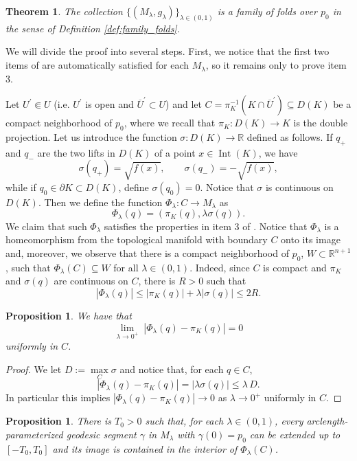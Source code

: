 \documentclass[11pt]{article}
\theoremstyle{definition}
\theoremstyle{remark}
\theoremstyle{plain}
\newtheorem{theorem}[definition]{Theorem}
\newtheorem{proposition}[definition]{Proposition}
\DeclareMathOperator{\Int}{Int}
\newcommand{\R}{\mathbb{R}}
\newcommand{\M}{M_\lambda}
\begin{document}
\begin{theorem}

The collection $\{(\M,g_\lambda)\}_{\lambda\in(0,1)}$ is a family of folds over $p_0$ in the sense of Definition \ref{def:family_folds}.

\end{theorem}

We will divide the proof into several steps. First, we notice that the first two items of  are automatically satisfied for each $\M$, so it remains only to prove item 3.

Let $U^\prime\Subset U$ (i.e. $U^\prime$ is open and $\overline U^\prime \subset U$) and let $C = \pi_K^{-1}(K\cap \overline U^\prime)\subseteq D(K)$ be a compact neighborhood of $p_0$, where we recall that $\pi_K:D(K)\to K$ is the double projection. Let us introduce the function $\sigma:D(K)\to \R$ defined as follows.
If $q_+$ and $q_-$ are the two lifts in $D(K)$ of a point
$x\in \Int(K)$, we have
$$\sigma(q_+)=\sqrt{f(x)},\qquad
\sigma(q_-)=-\sqrt{f(x)},$$
while if $q_0\in \partial K\subset D(K)$, define $\sigma(q_0)=0$.
Notice that $\sigma$ is continuous on $D(K)$. Then we define the function $\Phi_\lambda:C\to M_\lambda$ as
$$\Phi_\lambda(q) = (\pi_K(q), \lambda \sigma(q)).$$
We claim that such $\Phi_\lambda$ satisfies the properties in item 3 of . 
Notice that $\Phi_\lambda$ is a homeomorphism from the topological manifold with boundary $C$ onto its image and, moreover, we observe that there is a compact neighborhood of $p_0$, $W\subset \R^{n+1}$, such that $\Phi_\lambda(C)\subseteq W$ for all $\lambda\in (0,1)$. Indeed, since $C$ is compact and $\pi_K$ and $\sigma(q)$ are continuous on $C$, there is $R>0$ such that
$$|\Phi_\lambda(q)|\le |\pi_K(q)|+\lambda|\sigma(q)|\le 2R.$$

\begin{proposition}
  We have that
  $$\lim\limits_{\lambda\to 0^+}\; |\Phi_\lambda(q)- \pi_K(q)| = 0$$
  uniformly in $C$. 
\end{proposition}

\begin{proof}
  We let $D:= \max\limits_{C}\sigma$ and notice that, for each $q\in C$,
  $$|\Phi_\lambda(q)-\pi_K(q)| = \left|\lambda\sigma(q)\right| \le \lambda\, D.$$
  In particular this implies $|\Phi_\lambda(q)-\pi_K(q)|\to 0$ as $\lambda\to 0^+$ uniformly in $C$.
\end{proof}

\begin{proposition}
  There is $T_0>0$ such that, for each $\lambda\in (0,1)$, every arclength-parameterized geodesic segment $\gamma$ in $\M$ with $\gamma(0)=p_0$ can be extended up to $[-T_0,T_0]$ and its image is contained in the interior of $\Phi_\lambda(C)$.
\end{proposition} 
\end{document}

